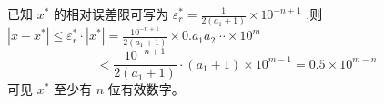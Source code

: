 \begin{corollary}
已知 $x^{*}$ 的相对误差限可写为 $\varepsilon_{r}^{*}=\frac{1}{2\left(a_{1}+1\right)} \times 10^{-n+1}$
,则 $\left|x-x^{*}\right| \leq \varepsilon_{r}^{*} \cdot\left|x^{*}\right|=\frac{10^{-n+1}}{2\left(a_{1}+1\right)} \times 0 . a_{1} a_{2} \cdots \times 10^{m}$
$$
<\frac{10^{-n+1}}{2\left(a_{1}+1\right)} \cdot\left(a_{1}+1\right) \times 10^{m-1}=0.5 \times 10^{m-n}
$$
可见 $x^{*}$ 至少有 $n$ 位有效数字。 
\end{corollary}
